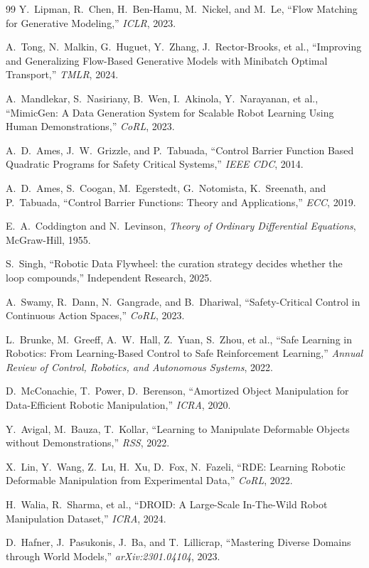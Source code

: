\documentclass[11pt,a4paper]{article}
\begin{document}
\begin{thebibliography}{99}
 Y.~Lipman, R.~Chen, H.~Ben-Hamu, M.~Nickel, and M.~Le, ``Flow
Matching for Generative Modeling,'' \emph{ICLR}, 2023.

 A.~Tong, N.~Malkin, G.~Huguet, Y.~Zhang, J.~Rector-Brooks,
et al., ``Improving and Generalizing Flow-Based Generative Models with Minibatch
Optimal Transport,'' \emph{TMLR}, 2024.

 A.~Mandlekar, S.~Nasiriany, B.~Wen, I.~Akinola,
Y.~Narayanan, et al., ``MimicGen: A Data Generation System for Scalable Robot
Learning Using Human Demonstrations,'' \emph{CoRL}, 2023.

 A.~D.~Ames, J.~W.~Grizzle, and P.~Tabuada, ``Control Barrier
Function Based Quadratic Programs for Safety Critical Systems,'' \emph{IEEE
CDC}, 2014.

 A.~D.~Ames, S.~Coogan, M.~Egerstedt, G.~Notomista,
K.~Sreenath, and P.~Tabuada, ``Control Barrier Functions: Theory and
Applications,'' \emph{ECC}, 2019.

 E.~A.~Coddington and N.~Levinson, \emph{Theory of Ordinary
Differential Equations}, McGraw-Hill, 1955.

 S.~Singh, ``Robotic Data Flywheel: the curation strategy
decides whether the loop compounds,'' Independent Research, 2025.

 A.~Swamy, R.~Dann, N.~Gangrade, and B.~Dhariwal,
``Safety-Critical Control in Continuous Action Spaces,'' \emph{CoRL}, 2023.

 L.~Brunke, M.~Greeff, A.~W.~Hall, Z.~Yuan, S.~Zhou,
et al., ``Safe Learning in Robotics: From Learning-Based Control to Safe
Reinforcement Learning,'' \emph{Annual Review of Control, Robotics, and
Autonomous Systems}, 2022.

 D.~McConachie, T.~Power, D.~Berenson, ``Amortized Object
Manipulation for Data-Efficient Robotic Manipulation,'' \emph{ICRA}, 2020.

 Y.~Avigal, M.~Bauza, T.~Kollar, ``Learning to Manipulate
Deformable Objects without Demonstrations,'' \emph{RSS}, 2022.

 X.~Lin, Y.~Wang, Z.~Lu, H.~Xu, D.~Fox, N.~Fazeli,
``RDE: Learning Robotic Deformable Manipulation from Experimental Data,''
\emph{CoRL}, 2022.

 H.~Walia, R.~Sharma, et al., ``DROID: A Large-Scale In-The-Wild
Robot Manipulation Dataset,'' \emph{ICRA}, 2024.

 D.~Hafner, J.~Pasukonis, J.~Ba, and T.~Lillicrap, ``Mastering
Diverse Domains through World Models,'' \emph{arXiv:2301.04104}, 2023.

\end{thebibliography}
\end{document}

